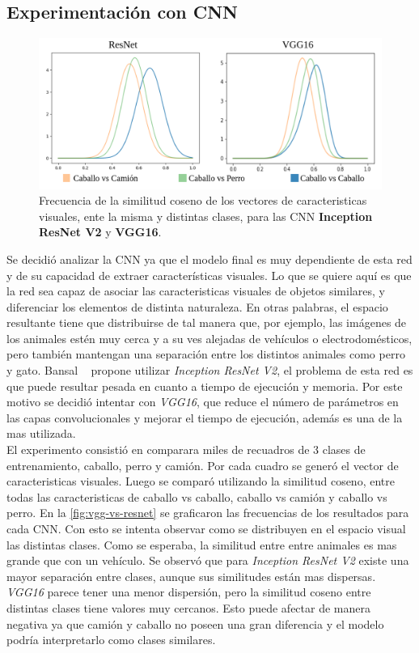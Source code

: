 \subsection{Experimentación con CNN} \label{ssec:experimentacionconcnn}
\begin{figure}
	\centering
	\includegraphics[width=1\linewidth]{img/vgg-vs-resnet}
	\caption{Frecuencia de la similitud coseno de los vectores de caracteristicas visuales, ente la misma y distintas clases, para las CNN  \textbf{Inception ResNet V2} y \textbf{VGG16}.}
	\label{fig:vgg-vs-resnet}
\end{figure}

Se decidió analizar la CNN ya que el modelo final es muy dependiente de esta red y de su capacidad de extraer características visuales. Lo que se quiere aquí es que la red sea capaz de asociar las caracteristicas visuales de objetos similares, y diferenciar los elementos de distinta naturaleza. En otras palabras, el espacio resultante tiene que distribuirse de tal manera que, por ejemplo, las imágenes de los animales estén muy cerca y a su ves alejadas de vehículos o electrodomésticos, pero también mantengan una separación entre los distintos animales como perro y gato. Bansal \etal~\cite{bansal2018zero} propone utilizar \textit{Inception ResNet V2}, el problema de esta red es que puede resultar pesada en cuanto a tiempo de ejecución y memoria. Por este motivo se decidió intentar con \textit{VGG16}, que reduce el número de parámetros en las capas convolucionales y mejorar el tiempo de ejecución, además es una de la mas utilizada.\\

El experimento consistió en comparara miles de recuadros de 3 clases de entrenamiento, caballo, perro y camión.  Por cada cuadro se generó el vector de caracteristicas visuales. Luego se comparó utilizando la similitud coseno, entre todas las caracteristicas de caballo vs caballo, caballo vs camión y caballo vs perro. En la \autoref{fig:vgg-vs-resnet} se graficaron las frecuencias de los resultados para cada CNN. Con esto se intenta observar como se distribuyen en el espacio visual las distintas clases. Como se esperaba, la similitud entre entre animales es mas grande que con un vehículo. Se observó que para \textit{Inception ResNet V2} existe una mayor separación entre clases, aunque sus similitudes están mas dispersas. \textit{VGG16} parece tener una menor dispersión, pero la similitud coseno entre distintas clases tiene valores muy cercanos. Esto puede afectar de manera negativa ya que camión y caballo no poseen una gran diferencia y el modelo podría interpretarlo como clases similares.\\


